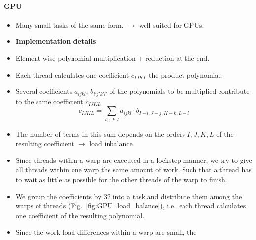 \documentclass[oribibl]{llncs2e/llncs}
\begin{document}
\paragraph{GPU}
\begin{itemize}
\item Many small tasks of the same form. $\rightarrow$ well suited for GPUs.
\item {\bf Implementation details}
\item Element-wise polynomial multiplication + reduction at the end.
\item Each thread calculates one coefficient $c_{IJKL}$ the product polynomial.
\item Several coefficients $a_{ijkl}$, $b_{i'j'k'l'}$ of the polynomials to be multiplied contribute to the same coefficient $c_{IJKL}$
\begin{equation}
    c_{IJKL} = \sum_{i,j,k,l} a_{ijkl} \cdot b_{I-i,J-j,K-k,L-l}
\end{equation}
\item The number of terms in this sum depends on the orders $I,J,K,L$ of the resulting coefficient $\rightarrow$ load inbalance
\item Since threads within a warp are executed in a lockstep manner, we try to give all threads within one warp the same amount of work. Such that a thread has to wait as little as possible for the other threads of the warp to finish.
\item We group the coefficients by 32 into a task and distribute them among the warps of threads (Fig.\ \ref{fig:GPU_load_balance}), i.e.\ each thread calculates one coefficient of the resulting polynomial.
\item Since the work load differences within a warp are small, the 


\end{itemize}
\end{document}
